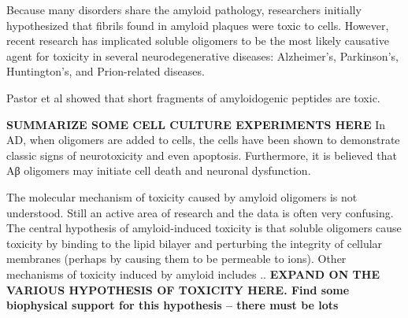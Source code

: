 

Because many disorders share the amyloid pathology, researchers initially hypothesized that fibrils found in amyloid plaques were toxic to cells. However, recent research has implicated soluble oligomers to be the most likely causative agent for toxicity in several neurodegenerative diseases: Alzheimer's, Parkinson's, Huntington's, and Prion-related diseases.\cite{Haass:2007db,Xue:2009da} %

Pastor et al showed that short fragments of amyloidogenic peptides are toxic.\cite{XXX}

\textbf{SUMMARIZE SOME CELL CULTURE EXPERIMENTS HERE}
In AD, when oligomers are added to cells, the cells have been shown to demonstrate classic signs of neurotoxicity and even apoptosis.\cite{Cappai:2007bc,Lambert:1998ve,Walsh:2002p2566,Shankar:2008bg} Furthermore, it is believed that Aβ oligomers may initiate cell death and neuronal dysfunction.\cite{Cappai:2007bc}

The molecular mechanism of toxicity caused by amyloid oligomers is not understood. %
Still an active area of research and the data is often very confusing. The central hypothesis of amyloid-induced toxicity is that soluble oligomers cause toxicity by binding to the lipid bilayer and perturbing the integrity of cellular membranes (perhaps by causing them to be permeable to ions).\cite{Martins:2008bz,Walsh:2007fu} Other mechanisms of toxicity induced by amyloid includes .. %
\textbf{EXPAND ON THE VARIOUS HYPOTHESIS OF TOXICITY HERE. Find some biophysical support for this hypothesis -- there must be lots}

